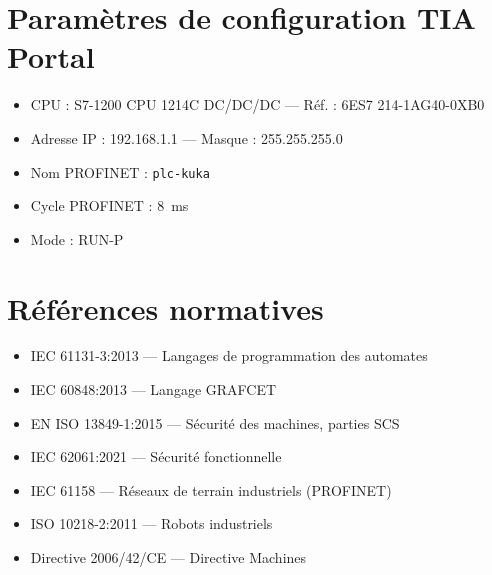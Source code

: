 \documentclass[12pt, a4paper]{report}
\newcommand{\profinet}{PROFINET}
\begin{document}
\nocite{*}
\printbibliography[heading=bibintoc, title={Bibliographie}]

\appendix
\chapter{Param\`etres de configuration TIA Portal}

\begin{infobox}
  \begin{itemize}
    \item CPU : S7-1200 CPU 1214C DC/DC/DC --- R\'ef. : 6ES7 214-1AG40-0XB0
    \item Adresse IP : 192.168.1.1 --- Masque : 255.255.255.0
    \item Nom \profinet{} : \texttt{plc-kuka}
    \item Cycle \profinet{} : \SI{8}{\milli\second}
    \item Mode : RUN-P
  \end{itemize}
\end{infobox}

\chapter{R\'ef\'erences normatives}

\begin{itemize}
  \item IEC 61131-3:2013 --- Langages de programmation des automates
  \item IEC 60848:2013 --- Langage GRAFCET
  \item EN ISO 13849-1:2015 --- S\'ecurit\'e des machines, parties SCS
  \item IEC 62061:2021 --- S\'ecurit\'e fonctionnelle
  \item IEC 61158 --- R\'eseaux de terrain industriels (\profinet{})
  \item ISO 10218-2:2011 --- Robots industriels
  \item Directive 2006/42/CE --- Directive Machines
\end{itemize}
\end{document}
